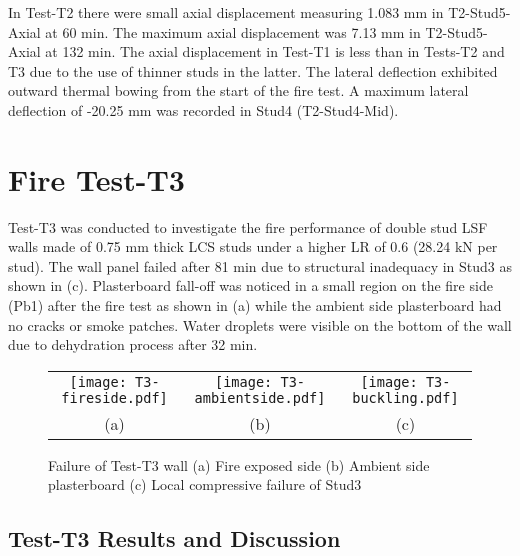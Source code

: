 In Test-T2 there were small axial displacement measuring 1.083 mm in T2-Stud5-Axial at 60 min. The maximum axial displacement was 7.13 mm in T2-Stud5-Axial at 132 min. The axial displacement in Test-T1 is less than in Tests-T2 and T3 due to the use of thinner studs in the latter. The lateral deflection exhibited outward thermal bowing from the start of the fire test. A maximum lateral deflection of -20.25 mm was recorded in Stud4 (T2-Stud4-Mid). 

\section{Fire Test-T3}

Test-T3 was conducted to investigate the fire performance of double stud LSF walls made of 0.75 mm thick LCS studs under a higher LR of 0.6 (28.24 kN per stud). The wall panel failed after 81 min due to structural inadequacy in Stud3 as shown in  (c). Plasterboard fall-off was noticed in a small region on the fire side (Pb1) after the fire test as shown in  (a) while the ambient side plasterboard had no cracks or smoke patches. Water droplets were visible on the bottom of the wall due to dehydration process after 32 min.
\begin{figure}[!htbp]
	\centering
		\begin{tabular}{ccc}
			\texttt{[image: T3-fireside.pdf]} & 
			\texttt{[image: T3-ambientside.pdf]} &
			\texttt{[image: T3-buckling.pdf]} \\	 
			(a) & (b) & (c)  \\ 
		\end{tabular} 
		\caption{Failure of Test-T3 wall (a) Fire exposed side (b) Ambient side plasterboard (c) Local compressive failure of Stud3}
		\label{fig:T3-failure}
\end{figure}

\subsection{Test-T3 Results and Discussion}

